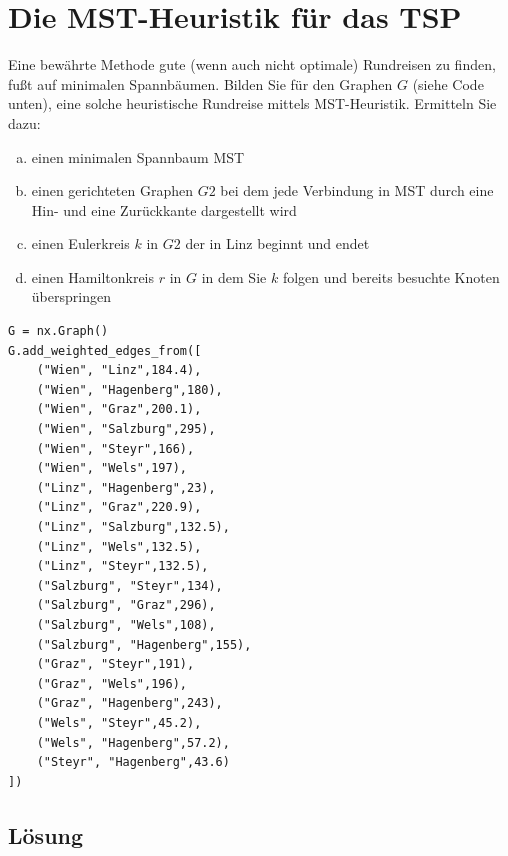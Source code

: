 \documentclass[a4paper,11pt]{report}
\begin{document}
    \newpage

    \chapter{Die MST-Heuristik für das TSP}
    \label{ch:mstHeuristicTSP}
    Eine bewährte Methode gute (wenn auch nicht optimale) Rundreisen zu finden, fußt auf minimalen Spannbäumen.
    Bilden Sie für den Graphen $G$ (siehe Code unten), eine solche heuristische Rundreise mittels MST-Heuristik.
    Ermitteln Sie dazu:

    \begin{enumerate}[a)]
        \item einen minimalen Spannbaum MST
        \item einen gerichteten Graphen $G2$ bei dem jede Verbindung in MST durch eine Hin- und
        eine Zurückkante dargestellt wird
        \item einen Eulerkreis $k$ in $G2$ der in Linz beginnt und endet
        \item einen Hamiltonkreis $r$ in $G$ in dem Sie $k$ folgen und bereits besuchte Knoten
        überspringen
    \end{enumerate}

    \begin{verbatim}
G = nx.Graph()
G.add_weighted_edges_from([
    ("Wien", "Linz",184.4),
    ("Wien", "Hagenberg",180),
    ("Wien", "Graz",200.1),
    ("Wien", "Salzburg",295),
    ("Wien", "Steyr",166),
    ("Wien", "Wels",197),
    ("Linz", "Hagenberg",23),
    ("Linz", "Graz",220.9),
    ("Linz", "Salzburg",132.5),
    ("Linz", "Wels",132.5),
    ("Linz", "Steyr",132.5),
    ("Salzburg", "Steyr",134),
    ("Salzburg", "Graz",296),
    ("Salzburg", "Wels",108),
    ("Salzburg", "Hagenberg",155),
    ("Graz", "Steyr",191),
    ("Graz", "Wels",196),
    ("Graz", "Hagenberg",243),
    ("Wels", "Steyr",45.2),
    ("Wels", "Hagenberg",57.2),
    ("Steyr", "Hagenberg",43.6)
])
    \end{verbatim}

    \section{Lösung}
\end{document}
